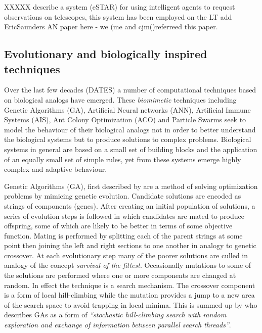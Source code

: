 XXXXX \citet{allan04estar} describe a system (eSTAR) for using intelligent agents to request observations on telescopes, this system has been employed on the LT add EricSaunders AN paper here - we (me and cjm()referreed this paper.

%
%
\subsection{Evolutionary and biologically inspired techniques}
\label{sub:review_bio}
Over the last few decades (DATES) a number of computational techniques based on biological analogs have emerged. These \emph{biomimetic} techniques including Genetic Algorithms (GA), Artificial Neural networks (ANN), Artificial Immune Systems (AIS), Ant Colony Optimization (ACO) and Particle Swarms seek to model the behaviour of their biological analogs not in order to better understand the biological systems but to produce solutions to complex problems. Biological systems in general are based on a small set of building blocks and the application of an equally small set of simple rules, yet from these systems emerge highly complex and adaptive behaviour. 

Genetic Algorithms (GA), first described by \citet{fraser57simulation} are a method of solving optimization problems by mimicing genetic evolution. Candidate solutions are encoded as strings of components (genes). After creating an initial population of solutions, a series of evolution steps is followed in which candidates are mated to produce offspring, some of which are likely to be better in terms of some objective function. Mating is performed by splitting each of the parent strings at some point then joining the left and right sections to one another in analogy to genetic crossover. At each evolutionary step many of the poorer solutions are culled in analogy of the concept \emph{survival of the fittest}. Occasionally mutations to some of the solutions are performed where one or more components are changed at random. In effect the technique is a search mechanism. The crossover component is a form of local hill-climbing while the mutation provides a jump to a new area of the search space to avoid trapping in local minima. This is summed up by \citet{russel03artificial} who describes GAs as a form of \emph{``stochastic hill-climbing search with random exploration and exchange of information between parallel search threads''}.

